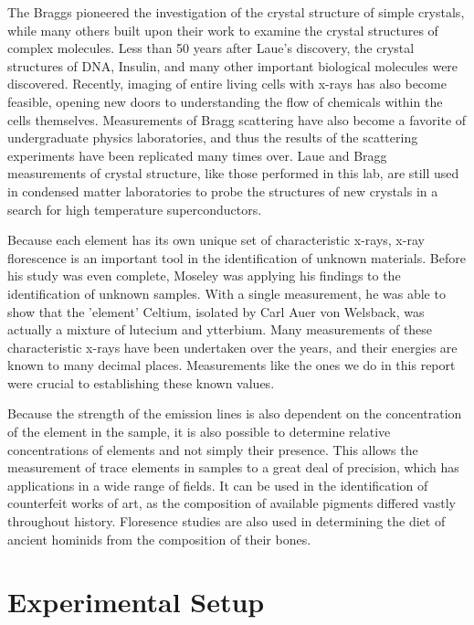 \documentclass[%
 reprint,
 amsmath,amssymb,
 aps,
 pra,
]{revtex4-1}
\begin{document}
The Braggs pioneered the investigation of the crystal structure of simple crystals\cite{bragg, xray_history}, while many others built upon their work to examine the crystal structures of complex molecules. Less than 50 years after Laue's discovery, the crystal structures of DNA\cite{dna1, dna2}, Insulin\cite{insulin}, and many other important biological molecules were discovered\cite{scatter_medicine_1, scatter_medicine_2}. Recently, imaging of entire living cells with x-rays has also become feasible, opening new doors to understanding the flow of chemicals within the cells themselves\cite{whole_cells}. Measurements of Bragg scattering have also become a favorite of undergraduate physics laboratories, and thus the results of the scattering experiments have been replicated many times over\cite{scatter_lab_1, scatter_lab_2, jensen}. Laue and Bragg measurements of crystal structure, like those performed in this lab, are still used in condensed matter laboratories to probe the structures of new crystals in a search for high temperature superconductors\cite{aronson, aronson2}.

Because each element has its own unique set of characteristic x-rays, x-ray florescence is an important tool in the identification of unknown materials. Before his study was even complete, Moseley was applying his findings to the identification of unknown samples. With a single measurement, he was able to show that the 'element' Celtium, isolated by Carl Auer von Welsback, was actually a mixture of lutecium and ytterbium\cite{xray_history}. Many measurements of these characteristic x-rays have been undertaken over the years, and their energies are known to many decimal places\cite{database1, database2}. Measurements like the ones we do in this report were crucial to establishing these known values.

Because the strength of the emission lines is also dependent on the concentration of the element in the sample\cite{miller}, it is also possible to determine relative concentrations of elements and not simply their presence. This allows the measurement of trace elements in samples to a great deal of precision, which has applications in a wide range of fields. It can be used in the identification of counterfeit works of art\cite{art1, art2, art3}, as the composition of available pigments differed vastly throughout history. Floresence studies are also used in determining the diet of ancient hominids from the composition of their bones\cite{art3, arch1, arch2, traces}.

\section{Experimental Setup}
\end{document}
